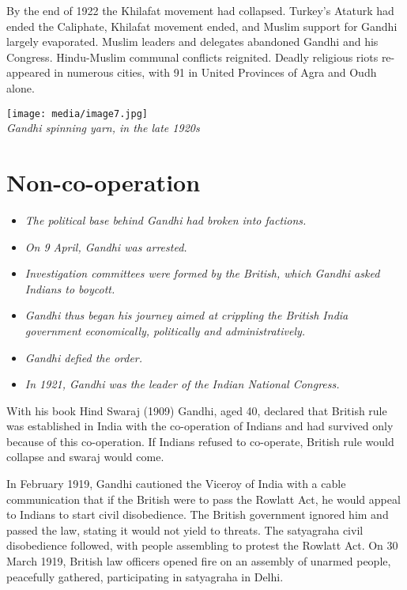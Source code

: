 By the end of 1922 the Khilafat movement had collapsed. Turkey's Ataturk
had ended the Caliphate, Khilafat movement ended, and Muslim support for
Gandhi largely evaporated. Muslim leaders and delegates abandoned Gandhi
and his Congress. Hindu-Muslim communal conflicts reignited. Deadly
religious riots re-appeared in numerous cities, with 91 in United
Provinces of Agra and Oudh alone.

\texttt{[image: media/image7.jpg]}\\
\emph{Gandhi spinning yarn, in the late 1920s}

\section{Non-co-operation}\label{non-co-operation}

\begin{itemize}
\item
  \emph{The political base behind Gandhi had broken into factions.}
\item
  \emph{On 9 April, Gandhi was arrested.}
\item
  \emph{Investigation committees were formed by the British, which
  Gandhi asked Indians to boycott.}
\item
  \emph{Gandhi thus began his journey aimed at crippling the British
  India government economically, politically and administratively.}
\item
  \emph{Gandhi defied the order.}
\item
  \emph{In 1921, Gandhi was the leader of the Indian National Congress.}
\end{itemize}

With his book Hind Swaraj (1909) Gandhi, aged 40, declared that British
rule was established in India with the co-operation of Indians and had
survived only because of this co-operation. If Indians refused to
co-operate, British rule would collapse and swaraj would come.

In February 1919, Gandhi cautioned the Viceroy of India with a cable
communication that if the British were to pass the Rowlatt Act, he would
appeal to Indians to start civil disobedience. The British government
ignored him and passed the law, stating it would not yield to threats.
The satyagraha civil disobedience followed, with people assembling to
protest the Rowlatt Act. On 30 March 1919, British law officers opened
fire on an assembly of unarmed people, peacefully gathered,
participating in satyagraha in Delhi.

